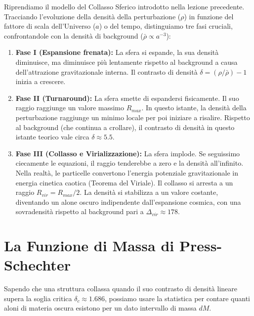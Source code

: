 \documentclass[11pt,a4paper]{report}
\begin{document}
Riprendiamo il modello del Collasso Sferico introdotto nella lezione precedente. Tracciando l'evoluzione della densità della perturbazione ($\rho$) in funzione del fattore di scala dell'Universo ($a$) o del tempo, distinguiamo tre fasi cruciali, confrontandole con la densità di background ($\bar{\rho} \propto a^{-3}$):
\begin{enumerate}
    \item \textbf{Fase I (Espansione frenata):} La sfera si espande, la sua densità diminuisce, ma diminuisce più lentamente rispetto al background a causa dell'attrazione gravitazionale interna. Il contrasto di densità $\delta = (\rho/\bar{\rho}) - 1$ inizia a crescere.
    \item \textbf{Fase II (Turnaround):} La sfera smette di espandersi fisicamente. Il suo raggio raggiunge un valore massimo $R_{max}$. In questo istante, la densità della perturbazione raggiunge un minimo locale per poi iniziare a risalire. Rispetto al background (che continua a crollare), il contrasto di densità in questo istante teorico vale circa $\delta \approx 5.5$.
    \item \textbf{Fase III (Collasso e Virializzazione):} La sfera implode. Se seguissimo ciecamente le equazioni, il raggio tenderebbe a zero e la densità all'infinito. Nella realtà, le particelle convertono l'energia potenziale gravitazionale in energia cinetica caotica (Teorema del Viriale). Il collasso si arresta a un raggio $R_{vir} = R_{max}/2$. La densità si stabilizza a un valore costante, diventando un alone oscuro indipendente dall'espansione cosmica, con una sovradensità rispetto al background pari a $\Delta_{vir} \approx 178$.
\end{enumerate}

\section{La Funzione di Massa di Press-Schechter}

Sapendo che una struttura collassa quando il suo contrasto di densità lineare supera la soglia critica $\delta_c \approx 1.686$, possiamo usare la statistica per contare quanti aloni di materia oscura esistono per un dato intervallo di massa $dM$. 
\end{document}
